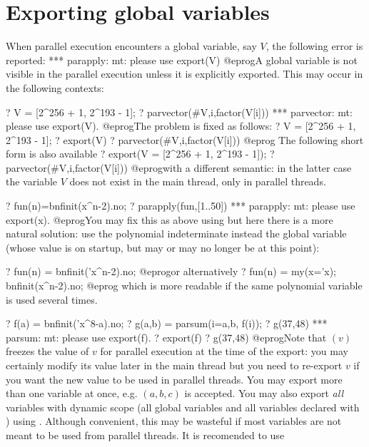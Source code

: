 \section{Exporting global variables}

When parallel execution encounters a global variable, say $V$,
the following error is reported:
\bprog
  *** parapply: mt: please use export(V)
@eprog\noindent A global variable is not visible in the parallel execution
unless it is explicitly exported. This may occur in the following contexts:


\bprog
? V = [2^256 + 1, 2^193 - 1];
? parvector(#V,i,factor(V[i]))
  *** parvector: mt: please use export(V).
@eprog\noindent The problem is fixed as follows:
\bprog
? V = [2^256 + 1, 2^193 - 1];
? export(V)
? parvector(#V,i,factor(V[i]))
@eprog The following short form is also available
\bprog
? export(V = [2^256 + 1, 2^193 - 1]);
? parvector(#V,i,factor(V[i]))
@eprog\noindent with a different semantic: in the latter case the variable
$V$ does not exist in the main thread, only in parallel threads.


\bprog
? fun(n)=bnfinit(x^n-2).no;
? parapply(fun,[1..50])
  *** parapply: mt: please use export(x).
@eprog\noindent You may fix this as above using  but here there
is a more natural solution: use the polynomial indeterminate 
instead the global variable  (whose value is  on startup, but
may or may no longer be  at this point):

\bprog
? fun(n) = bnfinit('x^n-2).no;
@eprog\noindent or alternatively
\bprog
? fun(n) = my(x='x); bnfinit(x^n-2).no;
@eprog
which is more readable if the same polynomial variable is used several times.


\bprog
? f(a) = bnfinit('x^8-a).no;
? g(a,b) = parsum(i=a,b, f(i));
? g(37,48)
  *** parsum: mt: please use export(f).
? export(f)
? g(37,48)
@eprog\noindent Note that $(v)$ freezes the value of $v$
for parallel execution at the time of the export: you may certainly modify
its value later in the main thread but you need to re-export $v$ if you want
the new value to be used in parallel threads. You may export more than one
variable at once, e.g. $(a,b,c)$ is accepted. You may also
export \emph{all} variables with dynamic scope (all global variables
and all variables declared with ) using .
Although convenient, this may be wasteful if most variables are not meant to
be used from parallel threads. It is recomended to use

